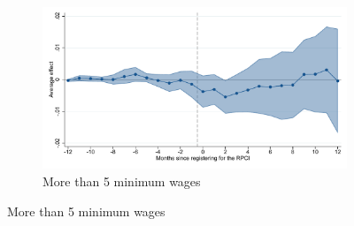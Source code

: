 \begin{figure}[H]
    \begin{subfigure}{0.32\textwidth}
    \caption{More than 5 minimum wages}
    \includegraphics[width=\textwidth]{04_Figures/muestra_10porciento/event_study_alta_sal_min_5_dcdh_connected.pdf}
    \end{subfigure}
    
\end{figure}

\clearpage

